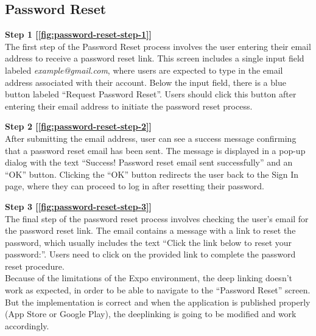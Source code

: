 \vspace{5mm}

\subsection{Password Reset}

\noindent \textbf{Step 1 [\ref{fig:password-reset-step-1}]} \\
The first step of the Password Reset process involves the user entering their email address to receive a password reset link. This screen includes a single input field labeled \textit{example@gmail.com}, where users are expected to type in the email address associated with their account. Below the input field, there is a blue button labeled ``Request Password Reset''. Users should click this button after entering their email address to initiate the password reset process.

\vspace{5mm}

\noindent \textbf{Step 2 [\ref{fig:password-reset-step-2}]} \\
After submitting the email address, user can see a success message confirming that a password reset email has been sent. The message is displayed in a pop-up dialog with the text ``Success! Password reset email sent successfully'' and an ``OK'' button. Clicking the ``OK'' button redirects the user back to the Sign In page, where they can proceed to log in after resetting their password.

\vspace{5mm}

\noindent \textbf{Step 3 [\ref{fig:password-reset-step-3}]} \\
The final step of the password reset process involves checking the user's email for the password reset link. The email contains a message with a link to reset the password, which usually includes the text ``Click the link below to reset your password:''. Users need to click on the provided link to complete the password reset procedure.\vspace{10mm} \\
Because of the limitations of the Expo environment, the deep linking doesn't work as expected, in order to be able to navigate to the ``Password Reset'' screen. But the implementation is correct and when the application is published properly (App Store or Google Play), the deeplinking is going to be modified and work accordingly.

\vspace{5mm}

